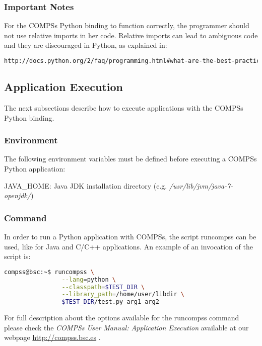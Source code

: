 \subsubsection{Important Notes}
For the COMPSs Python binding to function correctly, the programmer should not use relative imports 
in her code. Relative imports can lead to ambiguous code and they are discouraged in Python, as explained in:

\begin{lstlisting}[language=html]
http://docs.python.org/2/faq/programming.html#what-are-the-best-practices-for-using-import-in-a-module
\end{lstlisting}


\subsection{Application Execution}
The next subsections describe how to execute applications with the COMPSs Python binding.

\subsubsection{Environment}
The following environment variables must be defined before executing a COMPSs Python application:

JAVA\_HOME: Java JDK installation directory (e.g. \textit{/usr/lib/jvm/java-7-openjdk/})

\subsubsection{Command}
In order to run a Python application with COMPSs, the script runcompss can be used, like for 
Java and C/C++ applications. An example of an invocation of the script is:

\begin{lstlisting}[language=bash]
compss@bsc:~$ runcompss \
                --lang=python \
                --classpath=$TEST_DIR \
                --library_path=/home/user/libdir \
                $TEST_DIR/test.py arg1 arg2
\end{lstlisting}

For full description about the options available for the runcompss command please check the \textit{COMPSs User Manual: Application
Execution} available at our webpage \url{http://compss.bsc.es} . 
